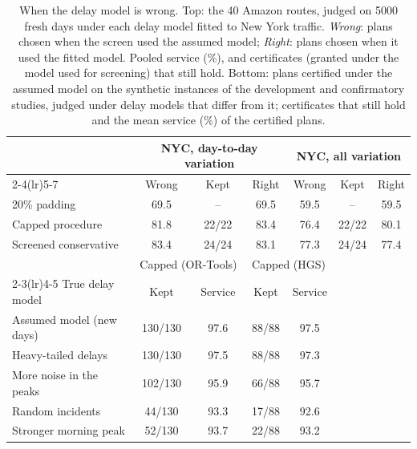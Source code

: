 \begin{table}[t]
\centering
\small
\setlength{\tabcolsep}{4pt}
\caption{When the delay model is wrong. Top: the 40 Amazon routes, judged on 5000 fresh days under each delay model fitted to New York traffic. \emph{Wrong}: plans chosen when the screen used the assumed model; \emph{Right}: plans chosen when it used the fitted model. Pooled service (\%), and certificates (granted under the model used for screening) that still hold. Bottom: plans certified under the assumed model on the synthetic instances of the development and confirmatory studies, judged under delay models that differ from it; certificates that still hold and the mean service (\%) of the certified plans.}
\label{tab:wrong}
\begin{tabular}{@{}lcccccc@{}}
\toprule
 & \multicolumn{3}{c}{NYC, day-to-day variation} & \multicolumn{3}{c}{NYC, all variation}\\
\cmidrule(lr){2-4}\cmidrule(lr){5-7}
 & Wrong & Kept & Right & Wrong & Kept & Right\\
\midrule
20\% padding & 69.5 & -- & 69.5 & 59.5 & -- & 59.5\\
Capped procedure & 81.8 & 22/22 & 83.4 & 76.4 & 22/22 & 80.1\\
Screened conservative & 83.4 & 24/24 & 83.1 & 77.3 & 24/24 & 77.4\\
\midrule
 & \multicolumn{2}{c}{Capped (OR-Tools)} & \multicolumn{2}{c}{Capped (HGS)} & & \\
\cmidrule(lr){2-3}\cmidrule(lr){4-5}
True delay model & Kept & Service & Kept & Service & & \\
\midrule
Assumed model (new days) & 130/130 & 97.6 & 88/88 & 97.5 & & \\
Heavy-tailed delays & 130/130 & 97.5 & 88/88 & 97.3 & & \\
More noise in the peaks & 102/130 & 95.9 & 66/88 & 95.7 & & \\
Random incidents & 44/130 & 93.3 & 17/88 & 92.6 & & \\
Stronger morning peak & 52/130 & 93.7 & 22/88 & 93.2 & & \\
\bottomrule
\end{tabular}
\end{table}
